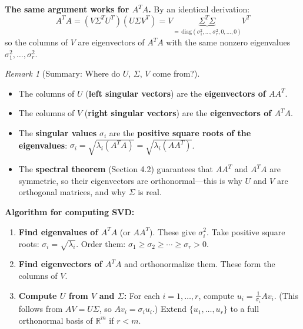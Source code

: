 \documentclass[11pt]{article}
\theoremstyle{definition}
\theoremstyle{plain}
\theoremstyle{remark}
\newtheorem{remark}[definition]{Remark}
\begin{document}
\textbf{The same argument works for $A^T A$.} By an identical derivation:
\[
A^T A = (V\Sigma^T U^T)(U\Sigma V^T) = V \underbrace{\Sigma^T \Sigma}_{=\,\text{diag}(\sigma_1^2,\ldots,\sigma_r^2,0,\ldots,0)} V^T
\]
so the columns of $V$ are eigenvectors of $A^T A$ with the same nonzero eigenvalues $\sigma_1^2, \ldots, \sigma_r^2$.

\bigskip
\begin{remark}[Summary: Where do $U$, $\Sigma$, $V$ come from?]
\begin{itemize}
\item The columns of $U$ (\textbf{left singular vectors}) are the \textbf{eigenvectors of $AA^T$}.
\item The columns of $V$ (\textbf{right singular vectors}) are the \textbf{eigenvectors of $A^T A$}.
\item The \textbf{singular values} $\sigma_i$ are the \textbf{positive square roots of the eigenvalues}: $\sigma_i = \sqrt{\lambda_i(A^T A)} = \sqrt{\lambda_i(AA^T)}$.
\item The \textbf{spectral theorem} (Section 4.2) guarantees that $AA^T$ and $A^T A$ are symmetric, so their eigenvectors are orthonormal---this is why $U$ and $V$ are orthogonal matrices, and why $\Sigma$ is real.
\end{itemize}
\end{remark}

\bigskip
\textbf{Algorithm for computing SVD:}
\begin{enumerate}
  \item \textbf{Find eigenvalues of $A^T A$} (or $AA^T$). These give $\sigma_i^2$. Take positive square roots: $\sigma_i = \sqrt{\lambda_i}$. Order them: $\sigma_1 \geq \sigma_2 \geq \cdots \geq \sigma_r > 0$.
  \item \textbf{Find eigenvectors of $A^T A$} and orthonormalize them. These form the columns of $V$.
  \item \textbf{Compute $U$ from $V$ and $\Sigma$:} For each $i = 1, \ldots, r$, compute $u_i = \frac{1}{\sigma_i} A v_i$. (This follows from $AV = U\Sigma$, so $Av_i = \sigma_i u_i$.) Extend $\{u_1, \ldots, u_r\}$ to a full orthonormal basis of $\mathbb{R}^m$ if $r < m$.
\end{enumerate}
\end{document}
